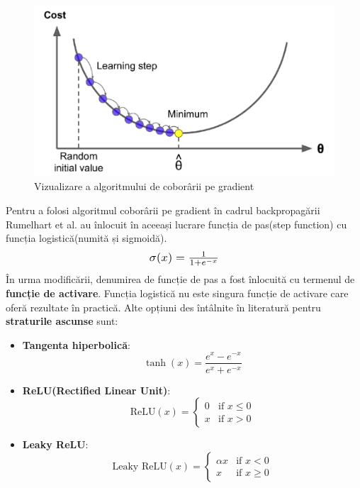 \begin{figure}[h]
         \centering 
         \includegraphics[width=.75\linewidth]{images/gradient-descent.png}
         \captionsetup{font=footnotesize}
         \caption{Vizualizare a algoritmului de coborârii pe gradient \cite{GD}}
\end{figure}
\newpage
Pentru a folosi algoritmul coborârii pe gradient în cadrul backpropagării Rumelhart et al. au înlocuit în aceeași lucrare \cite{rumelhart1986learning} funcția de pas(step function) cu funcția logistică(numită și sigmoidă).
\begin{equation}
    \scalebox{1.2}{$\sigma(x) = \frac{1}{1 + e^{-x}}$}
    \label{eq: Funcția sigmoidă}
\end{equation}
În urma modificării, denumirea de funcție de pas a fost înlocuită cu termenul de \textbf{funcție de activare}. Funcția logistică nu este singura funcție de activare care oferă rezultate în practică. Alte opțiuni des întâlnite în literatură pentru \textbf{straturile ascunse} sunt: 
\begin{itemize}

    \item \textbf{Tangenta hiperbolică}:
    \begin{equation}
        \tanh(x) = \frac{e^x - e^{-x}}{e^x + e^{-x}}
        \label{}
    \end {equation}
    
    \item \textbf{ReLU(Rectified Linear Unit)}:
    \begin{equation}
    \text{ReLU}(x) = 
        \begin{cases} 
        0 & \text{if } x \leq 0 \\
        x & \text{if } x > 0 
        \end{cases}
        \label{}
    \end {equation}
        
    \item \textbf{Leaky ReLU}:
    \begin{equation}
    \text{Leaky ReLU}(x) = 
        \begin{cases} 
        \alpha x & \text{if } x < 0 \\
        x & \text{if } x \geq 0 
        \end{cases}
        \label{}
    \end {equation}
    
\end{itemize}

